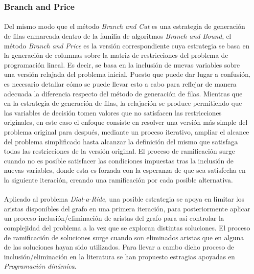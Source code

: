 \documentclass{subfiles}
\begin{document}
        \subsubsection{Branch and Price}
        \label{sec:solving_branch_price}

          \paragraph{}
          Del mismo modo que el método \emph{Branch and Cut} es una estrategia de generación de filas enmarcada dentro de la familia de algoritmos \emph{Branch and Bound}, el método \emph{Branch and Price} es la versión correspondiente cuya estrategia se basa en la generación de columnas sobre la matriz de restricciones del problema de programación lineal. Es decir, se basa en la inclusión de nuevas variables sobre una versión relajada del problema inicial. Puesto que puede dar lugar a confusión, es necesario detallar cómo se puede llevar esto a cabo para reflejar de manera adecuada la diferencia respecto del método de generación de filas. Mientras que en la estrategia de generación de filas, la relajación se produce permitiendo que las variables de decisión tomen valores que no satisfacen las restricciones originales, en este caso el enfoque consiste en resolver una versión más simple del problema original para después, mediante un proceso iterativo, ampliar el alcance del problema simplificado hasta alcanzar la definición del mismo que satisfaga todas las restricciones de la versión original. El proceso de ramificación surge cuando no es posible satisfacer las condiciones impuestas tras la inclusión de nuevas variables, donde esta es forzada con la esperanza de que sea satisfecha en la siguiente iteración, creando una ramificación por cada posible alternativa.

          \paragraph{}
          Aplicado al problema \emph{Dial-a-Ride}, una posible estrategia se apoya en limitar los aristas disponibles del grafo en una primera iteración, para posteriormente aplicar un proceso inclusión/eliminación de aristas del grafo para así controlar la complejidad del problema a la vez que se exploran distintas soluciones. El proceso de ramificación de soluciones surge cuando son eliminados aristas que en alguna de las soluciones hayan sido utilizados. Para llevar a cambo dicho proceso de inclusión/eliminación en la literatura se han propuesto estragias apoyadas en \emph{Programación dinámica}.
\end{document}
